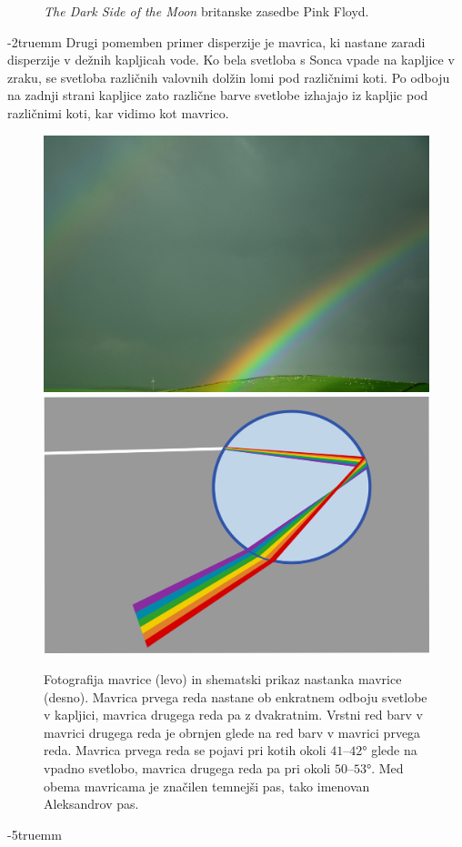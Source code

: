 \begin{example}
\begin{figure}[ht]
{{\it The Dark Side of the Moon} britanske zasedbe Pink Floyd.}
\label{fig:09_prizma}
\end{figure}
\vglue-2truemm
Drugi pomemben primer disperzije je mavrica, ki nastane zaradi
disperzije v dežnih kapljicah vode. Ko bela svetloba s Sonca vpade
na kapljice v zraku, se svetloba različnih valovnih dolžin 
lomi pod različnimi koti. Po odboju na zadnji strani kapljice 
zato različne barve svetlobe izhajajo iz kapljic pod različnimi koti, 
kar vidimo kot mavrico.
\begin{figure}[ht]
\centering
\includegraphics[width=7truecm]{slike/09_mavrica_photo.jpg}\hfill
\includegraphics[width=7truecm]{slike/09_mavrica_disp.png}
\caption{Fotografija mavrice (levo) in shematski prikaz nastanka
mavrice (desno). Mavrica prvega reda nastane ob enkratnem
odboju svetlobe v kapljici, mavrica drugega reda pa z dvakratnim.
Vrstni red barv v mavrici drugega reda je obrnjen glede na 
red barv v mavrici prvega reda. Mavrica prvega reda se pojavi pri 
kotih okoli $41$--$42\si{\degree}$ glede na vpadno svetlobo, mavrica drugega
reda pa pri okoli $50$--$53\si{\degree}$. Med obema mavricama je značilen 
temnejši pas, tako imenovan Aleksandrov pas.}
\label{fig:09_mavrica}
\end{figure}
\vglue-5truemm
\end{example}

